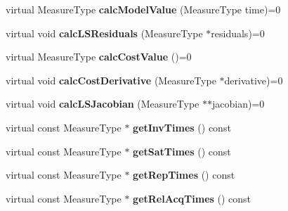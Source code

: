 \begin{DoxyCompactItemize}
\item 
\mbox{\label{class_ox_1_1_functions_t1_a2d5f4c9296daf3531e30a562348ad474}} 
virtual Measure\+Type {\bfseries calc\+Model\+Value} (Measure\+Type time)=0
\item 
\mbox{\label{class_ox_1_1_functions_t1_a6c69a4159a92c4ddb71ecba97fcdf6de}} 
virtual void {\bfseries calc\+L\+S\+Residuals} (Measure\+Type $\ast$residuals)=0
\item 
\mbox{\label{class_ox_1_1_functions_t1_af1475834e89c9304a96c776f3d5aacbf}} 
virtual Measure\+Type {\bfseries calc\+Cost\+Value} ()=0
\item 
\mbox{\label{class_ox_1_1_functions_t1_a413b0afca183b88613070ae87121ca66}} 
virtual void {\bfseries calc\+Cost\+Derivative} (Measure\+Type $\ast$derivative)=0
\item 
\mbox{\label{class_ox_1_1_functions_t1_a1ec8f2f6f84f848383a85f3ab2ebf648}} 
virtual void {\bfseries calc\+L\+S\+Jacobian} (Measure\+Type $\ast$$\ast$jacobian)=0
\item 
\mbox{\label{class_ox_1_1_functions_t1_a49b91143ad004a27661ec64aed8499a5}} 
virtual const Measure\+Type $\ast$ {\bfseries get\+Inv\+Times} () const
\item 
\mbox{\label{class_ox_1_1_functions_t1_aab067f89c6e9b38cc17b9aea53b979a1}} 
virtual const Measure\+Type $\ast$ {\bfseries get\+Sat\+Times} () const
\item 
\mbox{\label{class_ox_1_1_functions_t1_abffe539e01ca82bc1de2d68cec88bd6a}} 
virtual const Measure\+Type $\ast$ {\bfseries get\+Rep\+Times} () const
\item 
\mbox{\label{class_ox_1_1_functions_t1_abbc1b0095f4ddd626b7f795df97bb6e0}} 
virtual const Measure\+Type $\ast$ {\bfseries get\+Rel\+Acq\+Times} () const
\item 
\mbox{\label{class_ox_1_1_functions_t1_a52cf0677c084d11a201028dfec6b89ac}} 
$$
\end{DoxyCompactItemize}
